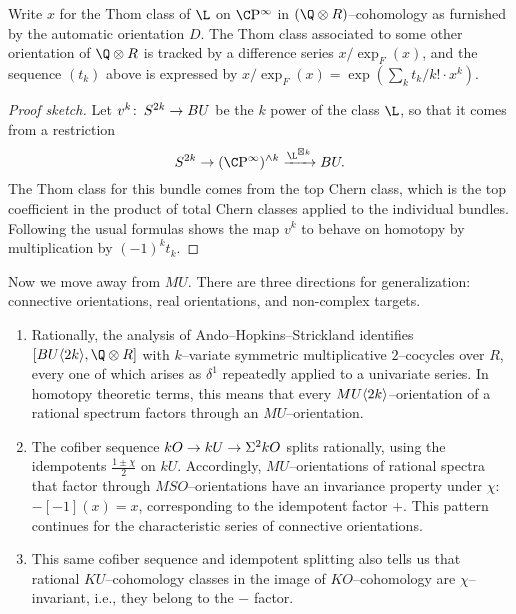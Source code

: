 \begin{proposition}
Write $x$ for the Thom class of $\L$ on $\CP^\infty$ in $(\Q \otimes R)$--cohomology as furnished by the automatic orientation $D$.  The Thom class associated to some other orientation of $\Q \otimes R$ is tracked by a difference series $x / \exp_F(x)$, and the sequence $(t_k)$ above is expressed by $x / \exp_F(x) = \exp(\sum_k t_k/k! \cdot x^k)$.
\end{proposition}
\begin{proof}[Proof sketch]
Let $v^k\colon\thinspace S^{2k} \to BU$ be the $k${\th} power of the class $\L$, so that it comes from a restriction \[S^{2k} \to (\CP^\infty)^{\sm k} \xrightarrow{\L^{\boxtimes k}} BU.\]  The Thom class for this bundle comes from the top Chern class, which is the top coefficient in the product of total Chern classes applied to the individual bundles.  Following the usual formulas shows the map $v^k$ to behave on homotopy by multiplication by $(-1)^k t_k$.
\end{proof}

Now we move away from $MU$.  There are three directions for generalization: connective orientations, real orientations, and non-complex targets.
\begin{enumerate}
\item Rationally, the analysis of Ando--Hopkins--Strickland identifies $[BU\<2k\>, \Q \otimes R]$ with $k$--variate symmetric multiplicative $2$--cocycles over $R$, every one of which arises as $\delta^1$ repeatedly applied to a univariate series.  In homotopy theoretic terms, this means that every $MU\langle2k\rangle$--orientation of a rational spectrum factors through an $MU$--orientation.
\item The cofiber sequence $kO \to kU \to \Sigma^2 kO$ splits rationally, using the idempotents $\frac{1 \pm \chi}{2}$ on $kU$.  Accordingly, $MU$--orientations of rational spectra that factor through $MSO$--orientations have an invariance property under $\chi$: $-[-1](x) = x$, corresponding to the idempotent factor $+$.  This pattern continues for the characteristic series of connective orientations.
\item This same cofiber sequence and idempotent splitting also tells us that rational $KU$--cohomology classes in the image of $KO$--cohomology are $\chi$--invariant, i.e., they belong to the $-$ factor.
\end{enumerate}

